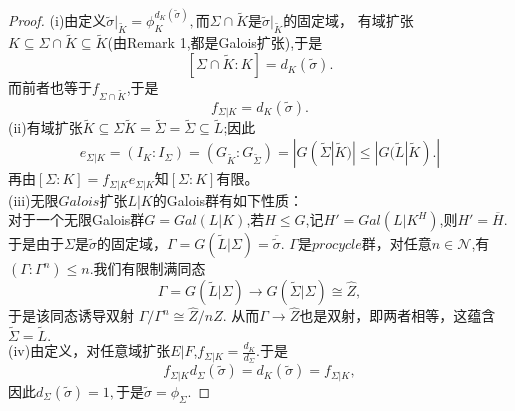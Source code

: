 \documentclass[UTF8]{article}
\begin{document}
\begin{proof}
	(i)由定义$\tilde{\sigma}|_{\widetilde{K}}=\phi_{K}^{d_{K}(\tilde{\sigma})},$而$\Sigma\cap \widetilde{K}$是$\tilde{\sigma}|_{\widetilde{K}}$的固定域，
	有域扩张$K\subseteq \Sigma\cap \widetilde{K}\subseteq \widetilde{K}$(由Remark 1,都是Galois扩张),于是$$[\Sigma\cap \widetilde{K}:K]=d_{K}(\tilde{\sigma}).$$
	而前者也等于$f_{\Sigma\cap \widetilde{K}}$,于是
	$$
	f_{\Sigma|K}=d_{K}(\tilde{\sigma}).
	$$
	(ii)有域扩张$\widetilde{K}\subseteq \Sigma\widetilde{K}=\widetilde{\Sigma}=\widetilde{\Sigma}\subseteq \widetilde{L}$;因此
	$$
	e_{\Sigma|K}=(I_{K}:I_{\Sigma})=(G_{\widetilde{K}}:G_{\widetilde{\Sigma}})=|G(\widetilde{\Sigma}|\widetilde{K})|\leq |G(\widetilde{L}|\widetilde{K}).|
	$$
	再由$[\Sigma:K]=f_{\Sigma|K}e_{\Sigma|K}$知$[\Sigma:K]$有限。\\
	(iii)无限$Galois$扩张$L|K$的Galois群有如下性质：\\
	对于一个无限Galois群$G=Gal(L|K)$,若$H\leq G$,记$H'=Gal(L|K^{H})$,则$H'=\overline{H}$.\\
	于是由于$\Sigma$是$\tilde{\sigma}$的固定域，$\Gamma=G(\widetilde{L}|\Sigma)=\overline{\tilde{\sigma}}.$ $\Gamma$是$procycle$群，对任意$n\in \mathcal{N}$,有$(\Gamma:\Gamma^{n})\leq n$.我们有限制满同态
	$$
	\Gamma=G(\widetilde{L}|\Sigma)\rightarrow G(\widetilde{\Sigma}|\Sigma)\cong \widehat{Z},
	$$
	于是该同态诱导双射
	$\Gamma/\Gamma^{n}\cong \widehat{Z}/n\widehat{Z}$.
	从而$\Gamma\rightarrow \widehat{Z}$也是双射，即两者相等，这蕴含$\widetilde{\Sigma}=\widetilde{L}.$\\
	(iv)由定义，对任意域扩张$E|F$,$f_{\Sigma|K}=\frac{d_{K}}{d_{\Sigma}}$.于是
	$$
	f_{\Sigma|K}d_{\Sigma}(\tilde{\sigma})=d_{K}(\tilde{\sigma})=f_{\Sigma|K},
	$$
	因此$d_{\Sigma}(\tilde{\sigma})=1,$于是$\tilde{\sigma}=\phi_{\Sigma}.$
\end{proof}
\end{document}
